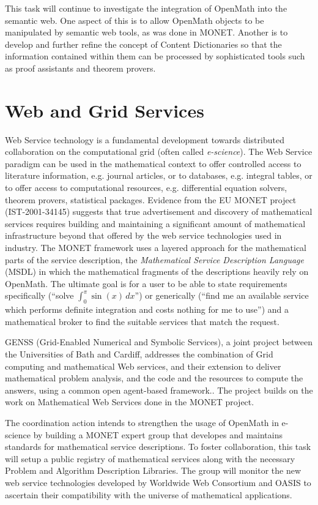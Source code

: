 \documentclass[draft]{artikel3}
\begin{document}
This task will continue to investigate the integration of OpenMath
into the semantic web.  One aspect of this is to allow OpenMath
objects to be manipulated by semantic web tools, as was done in MONET.
Another is to develop and further refine the concept of Content
Dictionaries so that the information contained within them can be
processed by sophisticated tools such as proof assistants and theorem
provers.

\section{Web and Grid Services}



Web Service technology is a fundamental development towards
distributed collaboration on the computational grid (often called
\emph{e-science}).  The Web Service paradigm can be used in the
mathematical context to offer controlled access to literature
information, e.g. journal articles, or to databases, e.g.  integral
tables, or to offer access to computational resources, e.g.
differential equation solvers, theorem provers, statistical packages.
Evidence from the EU MONET project (IST-2001-34145) suggests that true
advertisement and discovery of mathematical services requires building
and maintaining a significant amount of mathematical infrastructure
beyond that offered by the web service technologies used in industry.
The MONET framework uses a layered approach for the mathematical parts
of the service description, the \emph{Mathematical Service Description
  Language} (MSDL) in which the mathematical fragments of the
descriptions heavily rely on OpenMath.  The ultimate goal is for a
user to be able to state requirements specifically (``solve
$\int_0^\pi{}\sin(x)\,dx$'') or generically (``find me an available
service which performs definite integration and costs nothing for me
to use'') and a mathematical broker to find the suitable services that
match the request.

GENSS (Grid-Enabled Numerical and Symbolic Services), a joint project
between the Universities of Bath and Cardiff, addresses the
combination of Grid computing and mathematical Web services, and their
extension to deliver mathematical problem analysis, and the code and
the resources to compute the answers, using a common open agent-based
framework.. The project builds on the work on Mathematical Web
Services done in the MONET project.

The coordination action intends to strengthen the usage of OpenMath in
e-science by building a MONET expert group that developes and
maintains standards for mathematical service descriptions. To foster
collaboration, this task will setup a public registry of mathematical
services along with the necessary Problem and Algorithm Description
Libraries.  The group will monitor the new web service technologies
developed by Worldwide Web Consortium and OASIS to ascertain their
compatibility with the universe of mathematical applications.
\end{document}
